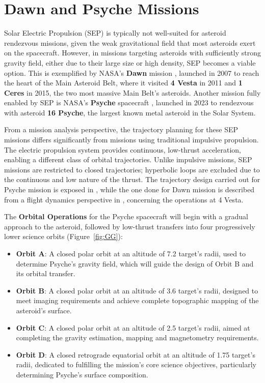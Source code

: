 \documentclass{Configuration_gigi/PoliMi3i_thesis}
\begin{document}
\section{Dawn and Psyche Missions}\label{Sec:Dawn and Psyche Missions}

Solar Electric Propulsion (SEP) is typically not well-suited for asteroid rendezvous missions, given the weak gravitational field that most asteroids exert on the spacecraft. However, in missions targeting asteroids with sufficiently strong gravity field, either due to their large size or high density, SEP becomes a viable option. This is exemplified by NASA's \textbf{Dawn} mission \cite{dawn}, launched in 2007 to reach the heart of the Main Asteroid Belt, where it visited \textbf{4 Vesta} in 2011 and \textbf{1 Ceres} in 2015, the two most massive Main Belt's asteroids. Another mission fully enabled by SEP is NASA’s \textbf{Psyche} spacecraft \cite{psyche}, launched in 2023 to rendezvous with asteroid \textbf{16 Psyche}, the largest known metal asteroid in the Solar System. 

From a mission analysis perspective, the trajectory planning for these SEP missions differs significantly from missions using traditional impulsive propulsion. The electric propulsion system provides continuous, low-thrust acceleration, enabling a different class of orbital trajectories. Unlike impulsive missions, SEP missions are restricted to closed trajectories; hyperbolic loops are excluded due to the continuous and low nature of the thrust. The trajectory design carried out for Psyche mission is exposed in \cite{psycheMA}, while the one done for Dawn mission is described from a flight dynamics perspective in \cite{dawnFD}, concerning the operations at 4 Vesta.

The \textbf{Orbital Operations} for the Psyche spacecraft will begin with a gradual approach to the asteroid, followed by low-thrust transfers into four progressively lower science orbits (Figure~\ref{fig:GG}):
\begin{itemize}
    \item \textbf{Orbit A}: A closed polar orbit at an altitude of 7.2 target's radii, used to determine Psyche's gravity field, which will guide the design of Orbit B and its orbital transfer.
    \item \textbf{Orbit B}: A closed polar orbit at an altitude of 3.6 target's radii, designed to meet imaging requirements and achieve complete topographic mapping of the asteroid's surface.
    \item \textbf{Orbit C}: A closed polar orbit at an altitude of 2.5 target's radii, aimed at completing the gravity estimation, mapping and magnetometry requirements.
    \item \textbf{Orbit D}: A closed retrograde equatorial orbit at an altitude of 1.75 target's radii, dedicated to fulfilling the mission’s core science objectives, particularly determining Psyche's surface composition. 
\end{itemize}
\end{document}
